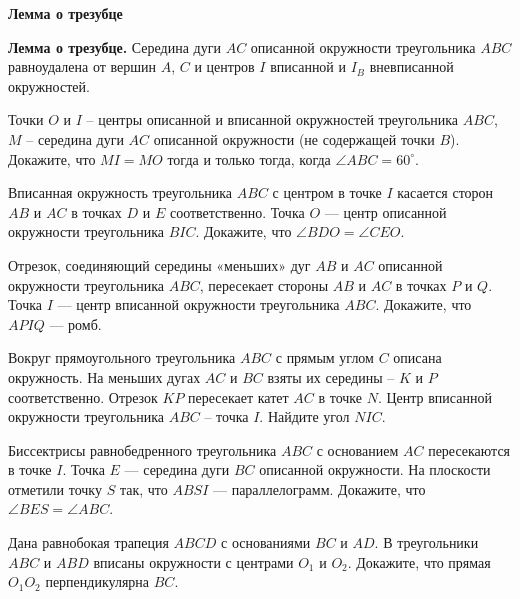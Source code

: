 \documentclass{article}
\begin{document}
    \large

    \begin{center}
        \textbf{Лемма о трезубце}
    \end{center}

    \textbf{Лемма о трезубце.} Середина дуги $AC$ описанной окружности треугольника $ABC$ равноудалена от вершин $A$, $C$ и центров $I$ вписанной и $I_B$ вневписанной окружностей.

    \begin{enumerate_boxed}

        \item Точки $O$ и $I$ -- центры описанной и вписанной окружностей треугольника $ABC$, $M$ -- середина дуги $AC$ описанной окружности (не содержащей точки $B$). Докажите, что $MI = MO$ тогда и только тогда, когда $\angle ABC = 60^{\circ}$.

        \item  Вписанная окружность треугольника $ABC$ с центром в точке $I$ касается сторон $AB$ и $AC$ в точках $D$ и $E$ соответственно.
        Точка $O$ --- центр описанной окружности треугольника $BIC$.
        Докажите, что $\angle BDO = \angle CEO$.

        \item Отрезок, соединяющий середины «меньших» дуг $AB$ и $AC$ описанной окружности треугольника $ABC$, пересекает стороны $AB$ и $AC$ в точках $P$ и $Q$.
        Точка $I$ --- центр вписанной окружности треугольника $ABC$.
        Докажите, что $APIQ$ --- ромб.

        \item Вокруг прямоугольного треугольника $ABC$ с прямым углом $C$ описана окружность.
        На меньших дугах $AC$ и $BC$ взяты их середины -- $K$ и $P$ соответственно.
        Отрезок $KP$ пересекает катет $AC$ в точке $N$.
        Центр вписанной окружности треугольника $ABC$ -- точка $I$.
        Найдите угол $NIC$.

        \item Биссектрисы равнобедренного треугольника $ABC$ с основанием $AC$ пересекаются в точке $I$.
        Точка $E$ --- середина дуги $BC$ описанной окружности.
        На плоскости отметили точку $S$ так, что $ABSI$ --- параллелограмм.
        Докажите, что $\angle BES = \angle ABC$.

        \item Дана равнобокая трапеция $ABCD$ с основаниями $BC$ и $AD$.
        В треугольники $ABC$ и $ABD$ вписаны окружности с центрами $O_1$ и $O_2$.
        Докажите, что прямая $O_{1}O_2$ перпендикулярна $BC$.


\end{enumerate_boxed}
\end{document}
